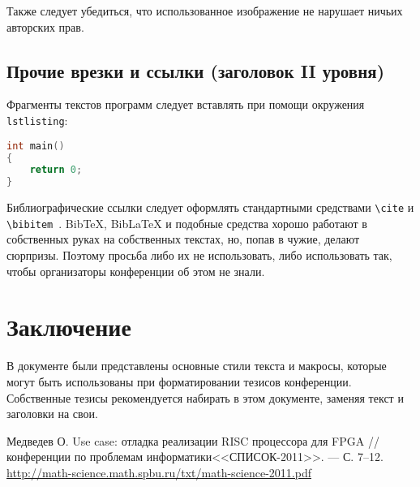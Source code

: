 \documentclass{math-mech-sci}
\begin{document}
Также следует убедиться, что использованное изображение не нарушает
ничьих авторских прав.

\subsection*{Прочие врезки и ссылки (заголовок II уровня)}

Фрагменты текстов программ следует вставлять при помощи окружения
\texttt{lstlisting}:

\begin{lstlisting}[language=C,label=lst:code1]
int main()
{
    return 0;
}
\end{lstlisting}

Библиографические ссылки следует оформлять стандартными средствами
\texttt{\textbackslash{}cite} и
\texttt{\textbackslash{}bibitem}~\cite{medvedev2011}. BibTeX, BibLaTeX
и подобные средства хорошо работают в собственных руках на собственных
текстах, но, попав в чужие, делают сюрпризы.  Поэтому просьба либо их
не использовать, либо использовать так, чтобы организаторы конференции
об этом не знали.

\section*{Заключение}

В документе были представлены основные стили текста и макросы, которые
могут быть использованы при форматировании тезисов конференции.
Собственные тезисы рекомендуется набирать в этом документе, заменяя
текст и заголовки на свои.

\begin{thebibliography}{8}

 Медведев О. Use case: отладка реализации RISC
  процессора для FPGA // %
  конференции по проблемам информатики<<СПИСОК-2011>>. --- %
  С. 7--12.
  \href{http://math-science.math.spbu.ru/txt/math-science-2011.pdf}{http://math-science.math.spbu.ru/txt/math-science-2011.pdf}

\end{thebibliography}
\end{document}
